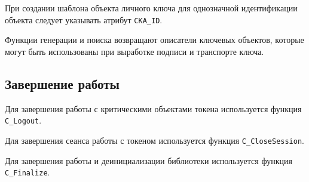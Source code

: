 При создании шаблона объекта личного ключа для однозначной
идентификации объекта следует указывать атрибут \verb|CKA_ID|.

Функции генерации и поиска возвращают описатели ключевых
объектов, которые могут быть использованы при выработке подписи
и транспорте ключа.



\subsection{Завершение работы}

Для завершения работы с критическими объектами токена
используется функция \verb|C_Logout|.

Для завершения сеанса работы с токеном используется функция
\verb|C_CloseSession|.

Для завершения работы и деинициализации библиотеки
используется функция \verb|C_Finalize|.
\fi
